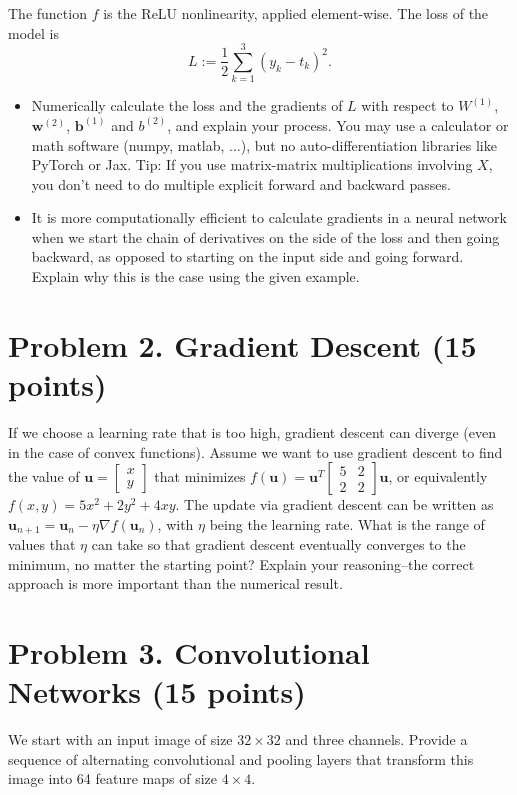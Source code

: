 \documentclass[a4paper,12pt]{article}
\begin{document}
The function $f$ is the ReLU nonlinearity, applied element-wise. The loss of the model is 
$$
    L := \frac{1}{2} \sum_{k=1}^3(y_k-t_k)^2.
$$
\begin{itemize}
    \item Numerically calculate the loss and the gradients of $L$ with respect to $W^{(1)}$, $\mathbf{w}^{(2)}$, $\mathbf{b}^{(1)}$ and $b^{(2)}$, and explain your process.
    You may use a calculator or math software (numpy, matlab, ...), but no auto-differentiation libraries like PyTorch or Jax.
    Tip: If you use matrix-matrix multiplications involving $X$, you don't need to do multiple explicit forward and backward passes.
    \item It is more computationally efficient to calculate gradients in a neural network when we start the chain of derivatives on the side of the loss and then going backward, as opposed to starting on the input side and going forward.
    Explain why this is the case using the given example.
\end{itemize}


\section*{Problem 2. Gradient Descent (15 points)}
If we choose a learning rate that is too high, gradient descent can diverge (even in the case of convex functions).
Assume we want to use gradient descent to find the value of $\mathbf{u} = \begin{bmatrix}
    x \\ y
\end{bmatrix}$ that minimizes $f(\mathbf{u}) = \mathbf{u}^T \begin{bmatrix}
    5 & 2 \\
    2 & 2
\end{bmatrix} \mathbf{u}$, or equivalently $f(x, y) = 5 x^2 + 2 y^2 + 4 x y$. The update via gradient descent can be written as $\mathbf{u}_{n+1} = \mathbf{u}_n - \eta \nabla f(\mathbf{u}_n)$, with $\eta$ being the learning rate. 
What is the range of values that $\eta$ can take so that gradient descent eventually converges to the minimum, no matter the starting point? Explain your reasoning–the correct approach is more important than the numerical result.  

\section*{Problem 3. Convolutional Networks (15 points)}
We start with an input image of size $32 \times 32$ and three channels. 
Provide a sequence of alternating convolutional and pooling layers that transform this image into 64 feature maps of size $4 \times 4$. 
\end{document}
